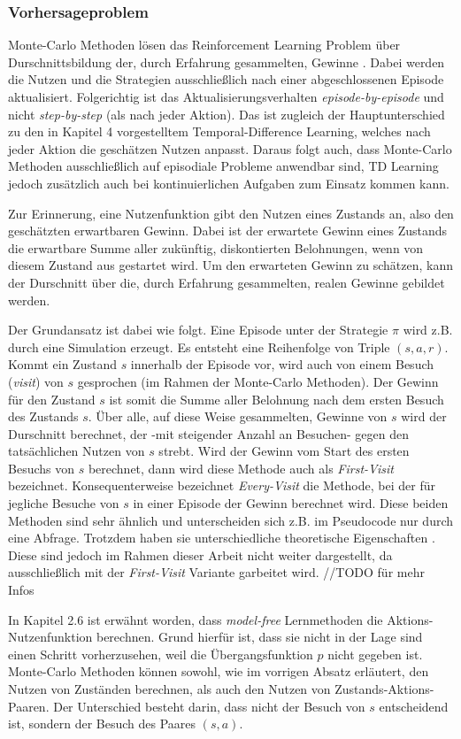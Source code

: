 \subsubsection{Vorhersageproblem}
Monte-Carlo Methoden lösen das Reinforcement Learning Problem über Durschnittsbildung der, durch Erfahrung gesammelten, Gewinne \cite[S.~91]{Sutton1998}. Dabei werden die Nutzen und die Strategien ausschließlich nach einer abgeschlossenen Episode aktualisiert. Folgerichtig ist das Aktualisierungsverhalten \textit{episode-by-episode} und nicht \textit{step-by-step} (als nach jeder Aktion)\cite[S.~91]{Sutton1998}. Das ist zugleich der Hauptunterschied zu den in Kapitel 4 vorgestelltem Temporal-Difference Learning, welches nach jeder Aktion die geschätzen Nutzen anpasst. Daraus folgt auch, dass Monte-Carlo Methoden ausschließlich auf episodiale Probleme anwendbar sind, TD Learning jedoch zusätzlich auch bei kontinuierlichen Aufgaben zum Einsatz kommen kann. 
\par
Zur Erinnerung, eine Nutzenfunktion gibt den Nutzen eines Zustands an, also den geschätzten erwartbaren Gewinn. Dabei ist der erwartete Gewinn eines Zustands die erwartbare Summe aller zukünftig, diskontierten Belohnungen, wenn von diesem Zustand aus gestartet wird. Um den erwarteten Gewinn zu schätzen, kann der Durschnitt über die, durch Erfahrung gesammelten, realen Gewinne gebildet werden.
\par 
Der Grundansatz ist dabei wie folgt. Eine Episode unter der Strategie $\pi$ wird z.B. durch eine Simulation erzeugt. Es entsteht eine Reihenfolge von Triple $(s,a,r)$. Kommt ein Zustand $s$ innerhalb der Episode vor, wird auch von einem Besuch (\textit{visit}) von $s$ gesprochen (im Rahmen der Monte-Carlo Methoden). Der Gewinn für den Zustand $s$ ist somit die Summe aller Belohnung nach dem ersten Besuch des Zustands $s$. Über alle, auf diese Weise gesammelten, Gewinne von $s$ wird der Durschnitt berechnet, der -mit steigender Anzahl an Besuchen- gegen den tatsächlichen Nutzen von $s$ strebt. Wird der Gewinn vom Start des ersten Besuchs von $s$ berechnet, dann wird diese Methode auch als \textit{First-Visit} bezeichnet. Konsequenterweise bezeichnet \textit{Every-Visit} die Methode, bei der für jegliche Besuche von $s$ in einer Episode der Gewinn berechnet wird. Diese beiden Methoden sind sehr ähnlich und unterscheiden sich z.B. im Pseudocode nur durch eine Abfrage. Trotzdem haben sie unterschiedliche theoretische Eigenschaften \cite[S.~92]{Sutton1998}. Diese sind jedoch im Rahmen dieser Arbeit nicht weiter dargestellt, da ausschließlich mit der \textit{First-Visit} Variante garbeitet wird. //TODO für mehr Infos
\par 
In Kapitel 2.6 ist erwähnt worden, dass \textit{model-free} Lernmethoden die Aktions-Nutzenfunktion berechnen. Grund hierfür ist, dass sie nicht in der Lage sind einen Schritt vorherzusehen, weil die Übergangsfunktion $p$ nicht gegeben ist. Monte-Carlo Methoden können sowohl, wie im vorrigen Absatz erläutert, den Nutzen von Zuständen berechnen, als auch den Nutzen von Zustands-Aktions-Paaren. Der Unterschied besteht darin, dass nicht der Besuch von $s$ entscheidend ist, sondern der Besuch des Paares $(s,a)$.

